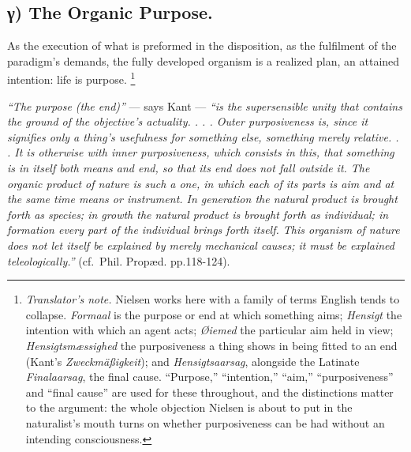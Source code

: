 \documentclass[12pt,a4paper]{book}
\renewcommand{\thefootnote}{\ifcase\value{footnote}\or *)\or **)\or ***)\fi}
\newcommand{\tnote}[1]{%
  \begingroup
  \renewcommand{\thefootnote}{\textdagger}%
  \footnote{\emph{Translator's note.} #1}%
  \addtocounter{footnote}{-1}%
  \endgroup}
\begin{document}
\subsection*{γ) The Organic Purpose.}

As the execution of what is preformed in the disposition, as the fulfilment of
the paradigm's demands, the fully developed organism is a realized plan, an
attained intention: life is purpose.\tnote{Nielsen works here with a family of
terms English tends to collapse. \emph{Formaal} is the purpose or end at which
something aims; \emph{Hensigt} the intention with which an agent acts;
\emph{Øiemed} the particular aim held in view; \emph{Hensigtsmæssighed} the
purposiveness a thing shows in being fitted to an end (Kant's
\emph{Zweckmäßigkeit}); and \emph{Hensigtsaarsag}, alongside the Latinate
\emph{Finalaarsag}, the final cause. ``Purpose,'' ``intention,'' ``aim,''
``purposiveness'' and ``final cause'' are used for these throughout, and the
distinctions matter to the argument: the whole objection Nielsen is about to
put in the naturalist's mouth turns on whether purposiveness can be had without
an intending consciousness.} \emph{``The purpose (the
end)''} --- says Kant --- \emph{``is the supersensible unity that contains the
ground of the objective's actuality. . . . Outer purposiveness is, since it
signifies only a thing's usefulness for something else, something merely
relative. . . It is otherwise with inner purposiveness, which consists in this,
that something is in itself both means and end, so that its end does not fall
outside it. The organic product of nature is such a one, in which each of its
parts is aim and at the same time means or instrument. In generation the
natural product is brought forth as species; in growth the natural product is
brought forth as individual; in formation every part of the individual brings
forth itself. This organism of nature does not let itself be explained by merely
mechanical causes; it must be explained teleologically.''} (cf.\ Phil. Propæd.
pp.118-124).
\end{document}
